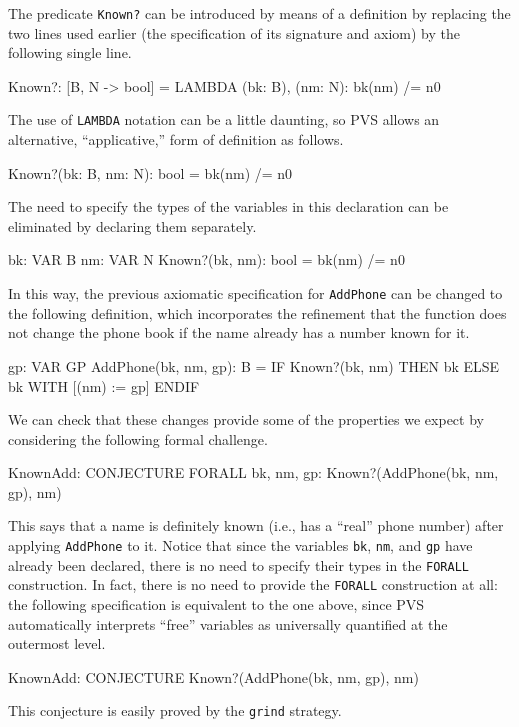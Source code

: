 The predicate {\tt Known?} can be introduced by means of a definition
by replacing the two lines used earlier (the specification of its
signature and axiom) by the following single line.
\begin{pvsexample}
Known?: [B, N -> bool] = LAMBDA (bk: B), (nm: N): bk(nm) /= n0
\end{pvsexample}
The use of {\tt LAMBDA} notation can be a little daunting, so PVS allows an
alternative, ``applicative,'' form of definition as follows.
\begin{pvsexample}
Known?(bk: B, nm: N): bool = bk(nm) /= n0
\end{pvsexample}
The need to specify the types of the variables in this declaration
can be eliminated by declaring them separately.
\begin{pvsexample}
bk: VAR B
nm: VAR N
Known?(bk, nm): bool = bk(nm) /= n0
\end{pvsexample}
In this way, the previous axiomatic specification for {\tt AddPhone} can be
changed to the following definition, which incorporates the refinement
that the function does not change the phone book if the name already
has a number known for it.
\begin{pvsexample}
gp: VAR GP
AddPhone(bk, nm, gp): B = 
  IF Known?(bk, nm) THEN bk ELSE bk WITH [(nm) := gp] ENDIF
\end{pvsexample}
We can check that these changes provide some of the properties we
expect by considering the following formal challenge.
\begin{pvsexample}
KnownAdd: CONJECTURE  FORALL bk, nm, gp: Known?(AddPhone(bk, nm, gp), nm)
\end{pvsexample}
This says that a name is definitely known (i.e., has a ``real'' phone
number) after applying {\tt AddPhone} to it.   Notice that since the
variables {\tt bk}, {\tt nm}, and {\tt gp} have already been declared,
there is no need to specify their types in the {\tt FORALL} construction.
In fact, there is no need to provide the {\tt FORALL} construction at all:
the following specification is equivalent to the one above, since PVS
automatically interprets ``free'' variables as universally quantified
at the outermost level.
\begin{pvsexample}
KnownAdd: CONJECTURE  Known?(AddPhone(bk, nm, gp), nm)
\end{pvsexample}
This conjecture is easily proved by the {\tt grind} strategy.

